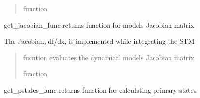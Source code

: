 \documentclass[letterpaper,10pt,english]{sphinxmanual}
\begin{document}
\begin{fulllineitems}
\begin{fulllineitems}
\begin{quote}
\begin{description}
\sphinxAtStartPar
function

\end{description}\end{quote}

\end{fulllineitems}


\begin{fulllineitems}
\label{\detokenize{models:pyraa.models.Models.get_jacobian_func}}
\pysigstartsignatures
{}
\pysigstopsignatures
\sphinxAtStartPar
get\_jacobian\_func \sphinxhyphen{} returns function for model\textquotesingle{}s Jacobian matrix

\sphinxAtStartPar
The Jacobian, df/dx, is implemented while integrating the STM
\begin{quote}\begin{description}
\sphinxAtStartPar
{} \sphinxhyphen{}\sphinxhyphen{} 

\sphinxAtStartPar
{} \sphinxhyphen{}\sphinxhyphen{} fucntion evaluates the dynamical models Jacobian matrix

\sphinxAtStartPar
function

\end{description}\end{quote}

\end{fulllineitems}


\begin{fulllineitems}
\label{\detokenize{models:pyraa.models.Models.get_pstates_func}}
\pysigstartsignatures
{}
\pysigstopsignatures
\sphinxAtStartPar
get\_pstates\_func \sphinxhyphen{} returns function for calculating primary states
\begin{quote}\begin{description}
\sphinxAtStartPar
{} \sphinxhyphen{}\sphinxhyphen{} 


\end{description}
\end{quote}
\end{fulllineitems}
\end{fulllineitems}
\end{document}
